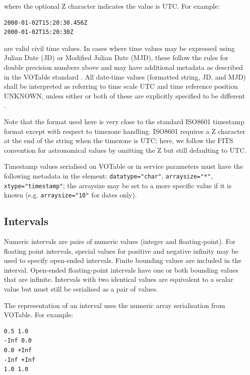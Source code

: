 \documentclass[11pt,letter]{ivoa}
\begin{document}
where the optional Z character indicates the value is UTC. For example:

\begin{verbatim}
2000-01-02T15:20:30.456Z
2000-01-02T15:20:30Z
\end{verbatim}

are valid civil time values. In cases where time values may be
expressed using Julian Date (JD) or Modified Julian Date (MJD), these follow the
rules for double precision numbers above and may have additional metadata as
described in the VOTable standard \citep{2019ivoa.spec.1021O}. All date-time values (formatted string, JD,
and MJD) shall be interpreted as referring to time scale UTC and time reference
position UNKNOWN, unless either or both of these are explicitly specified to be
different \citep{2007ivoa.spec.1030R}.

Note that the format used here is very close to the standard ISO8601 timestamp
format except with respect to timezone handling. ISO8601 requires a Z character
at the end of the string when the timezone is UTC; here, we follow the FITS
\citep{std:FITS} convention for astronomical values by omitting the Z but still
defaulting to UTC.

Timestamp values serialised on VOTable or in service parameters must have the following metadata in
the  element: \verb|datatype="char"|,  \verb|arraysize="*"|,
\verb|xtype="timestamp"|; the arraysize may be set to a more specific value if it is known (e.g.
\verb|arraysize="10"| for dates only).

\subsection{Intervals}
Numeric intervals are pairs of numeric values (integer and floating-point). For floating point
intervals, special values for positive and negative infinity may be used to specify open-ended intervals.
Finite bounding values are included in the interval. Open-ended floating-point
intervals have one or both bounding values that are infinite. Intervals with two identical values
are equivalent to a scalar value but must still be serialised as a pair of values.

The representation of an interval uses the numeric array serialisation from
VOTable. For example:

\begin{verbatim}
0.5 1.0
-Inf 0.0
0.0 +Inf
-Inf +Inf
1.0 1.0
\end{verbatim}
\end{document}
